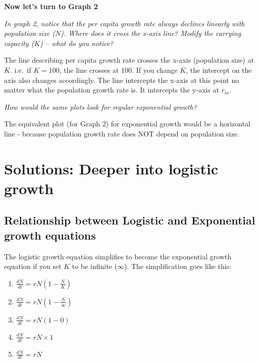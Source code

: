 \documentclass[
  a4paper]{book}
\providecommand{\tightlist}{%
  \setlength{\itemsep}{0pt}\setlength{\parskip}{0pt}}
\begin{document}
\textbf{Now let's turn to Graph 2}

\emph{In graph 2, notice that the per capita growth rate always declines linearly with population size (\(N\)). Where does it cross the x-axis line? Modify the carrying capacity (\(K\)) -- what do you notice?}

The line describing per capita growth rate crosses the x-axis (population size) at \(K\). i.e.~if \(K = 100\), the line crosses at 100. If you change \(K\), the intercept on the axis also changes accordingly. The line intercepts the x-axis at this point no matter what the population growth rate is. It intercepts the y-axis at \(r_m\).

\emph{How would the same plots look for regular exponential growth?}

The equivalent plot (for Graph 2) for exponential growth would be a horizontal line - because population growth rate does NOT depend on population size.

\hypertarget{solutions-deeper-into-logistic-growth}{%
\section{Solutions: Deeper into logistic growth}\label{solutions-deeper-into-logistic-growth}}

\hypertarget{relationship-between-logistic-and-exponential-growth-equations}{%
\subsection{Relationship between Logistic and Exponential growth equations}\label{relationship-between-logistic-and-exponential-growth-equations}}

The logistic growth equation simplifies to become the exponential growth equation if you set \(K\) to be infinite (\(\infty\)). The simplification goes like this:

\begin{enumerate}
\def\labelenumi{\arabic{enumi}.}
\tightlist
\item
  \(\frac{d N}{d t}=r N\left(1-\frac{N}{K}\right)\)
\item
  \(\frac{d N}{d t}=r N\left(1-\frac{N}{\infty}\right)\)
\item
  \(\frac{d N}{d t}=r N\left(1-0\right)\)
\item
  \(\frac{d N}{d t}=r N \times 1\)
\item
  \(\frac{d N}{d t}=r N\)
\end{enumerate}
\end{document}
